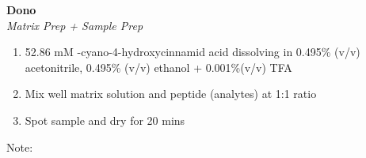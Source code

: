 \textbf{Dono} 
\\
\textit{Matrix Prep + Sample Prep}
\begin{enumerate}
\item{52.86 mM \alpha-cyano-4-hydroxycinnamid acid dissolving in 0.495\% (v/v) acetonitrile, 0.495\% (v/v) ethanol + 0.001\%(v/v) TFA}
\item{Mix well matrix solution and peptide (analytes) at 1:1 ratio}
\item{Spot sample and dry for 20 mins}
\end{enumerate}
\footnotesize Note: 